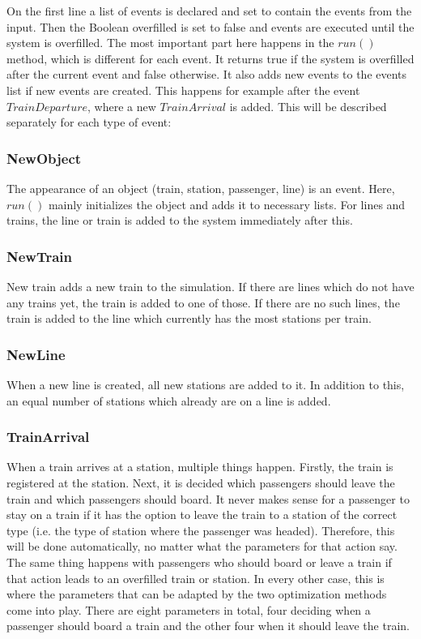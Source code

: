 \documentclass[10pt]{scrreprt}
\begin{document}
On the first line a list of events is declared and set to contain the events from the input. Then the Boolean overfilled is set to false and events are executed until the system is overfilled. The most important part here happens in the $run()$ method, which is different for each event. It returns true if the system is overfilled after the current event and false otherwise. It also adds new events to the events list if new events are created. This happens for example after the event $TrainDeparture$, where a new $TrainArrival$ is added. This will be described separately for each type of event:

\subsubsection{NewObject}
The appearance of an object (train, station, passenger, line) is an event. Here, $run()$ mainly initializes the object and adds it to necessary lists. For lines and trains, the line or train is added to the system immediately after this.

\subsubsection{NewTrain}
New train adds a new train to the simulation. If there are lines which do not have any trains yet, the train is added to one of those. If there are no such lines, the train is added to the line which currently has the most stations per train.

\subsubsection{NewLine}
When a new line is created, all new stations are added to it. In addition to this, an equal number of stations which already are on a line is added.

\subsubsection{TrainArrival}
When a train arrives at a station, multiple things happen. Firstly, the train is registered at the station. Next, it is decided which passengers should leave the train and which passengers should board. It never makes sense for a passenger to stay on a train if it has the option to leave the train to a station of the correct type (i.e. the type of station where the passenger was headed). Therefore, this will be done automatically, no matter what the parameters for that action say. The same thing happens with passengers who should board or leave a train if that action leads to an overfilled train or station. In every other case, this is where the parameters that can be adapted by the two optimization methods come into play. There are eight parameters in total, four deciding when a passenger should board a train and the other four when it should leave the train.
\end{document}
